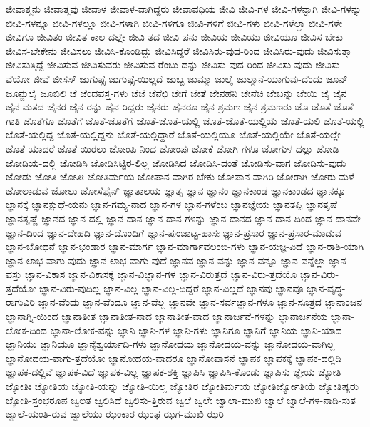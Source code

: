 {ಜೀವಾತ್ಮನು
ಜೀವಾತ್ಮವು
ಜೀವಾಳ
ಜೀವಾಳ-ವಾಗಿದ್ದರು
ಜೀವಾವಧಿಯ
ಜೀವಿ
ಜೀವಿ-ಗಳ
ಜೀವಿ-ಗಳನ್ನಾಗಿ
ಜೀವಿ-ಗಳನ್ನು
ಜೀವಿ-ಗಳನ್ನೂ
ಜೀವಿ-ಗಳಲ್ಲೂ
ಜೀವಿ-ಗಳಾಗಿ
ಜೀವಿ-ಗಳಿಗೂ
ಜೀವಿ-ಗಳಿಗೆ
ಜೀವಿ-ಗಳು
ಜೀವಿ-ಗಳೆಲ್ಲಾ
ಜೀವಿ-ಗಳೇ
ಜೀವಿಗೂ
ಜೀವಿತಂ
ಜೀವಿತ-ಕಾಲ-ದಲ್ಲೇ
ಜೀವಿ-ತದ
ಜೀವಿ-ಪನು
ಜೀವಿಯ
ಜೀವಿಯು
ಜೀವಿಯೂ
ಜೀವಿಸ-ಬೇಕು
ಜೀವಿಸ-ಬೇಕೇನು
ಜೀವಿಸಲು
ಜೀವಿಸಿ-ಕೊಂಡಿದ್ದು
ಜೀವಿಸಿದ್ದರೆ
ಜೀವಿಸಿರು-ವುದ-ರಿಂದ
ಜೀವಿಸಿರು-ವುದು
ಜೀವಿಸುತ್ತಾ
ಜೀವಿಸುತ್ತಿದ್ದೆ
ಜೀವಿಸುವ
ಜೀವಿಸುವರು
ಜೀವಿಸುವ-ರೆಂಬು-ದನ್ನು
ಜೀವಿಸು-ವುದ-ರಿಂದ
ಜೀವಿಸು-ವುದು
ಜೀವಿಸು-ವೆಯೋ
ಜೀವೆ
ಜೀಸಸ್
ಜುಗುಪ್ಸೆ
ಜುಗುಪ್ಸೆ-ಯಿಲ್ಲದೆ
ಜುಬ್ಬ
ಜುಮ್ಮಾ
ಜುಲೈ
ಜುಲ್ಮಾನೆ-ಯಾಗುವು-ದೆಂದು
ಜೂನ್
ಜೂನ್ಜುಲೈ
ಜೂಬಿಲಿ
ಜೆ
ಜೆಂದವಸ್ತ-ಗಳು
ಜೆಜೆ
ಜೆನೆಛಿ
ಜೇಗೆ
ಜೇತೆ
ಜೇನಹನಿ
ಜೇನೆಚಿ
ಜೇಬನ್ನು
ಜೇಯಿ
ಜೈ
ಜೈನ
ಜೈನ-ಮತದ
ಜೈನರ
ಜೈನ-ರನ್ನು
ಜೈನ-ರಿದ್ದರು
ಜೈನರು
ಜೈನರೂ
ಜೈನ-ಶ್ರಮಣ
ಜೈನ-ಶ್ರಮಣರು
ಜೊ
ಜೊತೆ
ಜೊತೆ-ಗಾತಿ
ಜೊತೆಗೂ
ಜೊತೆಗೆ
ಜೊತೆ-ಜೊತೆಗೆ
ಜೊತೆ-ಜೊತೆ-ಯಲ್ಲಿ
ಜೊತೆ-ಜೊತೆ-ಯಲ್ಲಿಯೆ
ಜೊತೆ-ಯಲಿ
ಜೊತೆ-ಯಲ್ಲಿ
ಜೊತೆ-ಯಲ್ಲಿದ್ದ
ಜೊತೆ-ಯಲ್ಲಿದ್ದನು
ಜೊತೆ-ಯಲ್ಲಿದ್ದಾರೆ
ಜೊತೆ-ಯಲ್ಲಿಯೂ
ಜೊತೆ-ಯಲ್ಲಿಯೇ
ಜೊತೆ-ಯಲ್ಲೇ
ಜೊತೆ-ಯಾದರೆ
ಜೊತೆ-ಯಿರಲು
ಜೋಂಪಿ-ನಿಂದ
ಜೋಂಪು
ಜೋಕೆ
ಜೋಗಿ-ಗಳೂ
ಜೋಗುಳ-ದಲ್ಲು
ಜೋಡಿ
ಜೋಡಿಯ-ದಲ್ಲಿ
ಜೋಡಿಸಿ
ಜೋಡಿಸಿಟ್ಟಿರ-ಲಿಲ್ಲ
ಜೋಡಿಸಿದ
ಜೋಡಿಸಿ-ದಂತೆ
ಜೋಡಿಸು-ವಾಗ
ಜೋಡಿಸು-ವುದು
ಜೋಡು
ಜೋತಿ
ಜೋತಿಃ
ಜೋತಿರ್ಮಯ
ಜೋಪಾನ-ವಾಗಿರ-ಬೇಕು
ಜೋಪಾನ-ವಾಗಿರಿ
ಜೋರಾಗಿ
ಜೋರು-ಮಳೆ
ಜೋಲಾಡುವ
ಜೋಲು
ಜೋಸೆಫೈನ್
ಜ್ಞಾತಾಲಯ
ಜ್ಞಾತೃ
ಜ್ಞಾನ
ಜ್ಞಾನಂ
ಜ್ಞಾನಕಾಂಡ
ಜ್ಞಾನಕಾಂಡದ
ಜ್ಞಾನಕ್ಕೂ
ಜ್ಞಾನಕ್ಕೆ
ಜ್ಞಾನಕ್ಷುಧೆ-ಯನು
ಜ್ಞಾನ-ಗಮ್ಯ-ನಾದ
ಜ್ಞಾನ-ಗಳ
ಜ್ಞಾನ-ಗಳೆಂಬ
ಜ್ಞಾನಜ್ಞೇಯ
ಜ್ಞಾನತಪ್ಪಿ
ಜ್ಞಾನತೃಷೆ
ಜ್ಞಾನತೃಷ್ಣೆ
ಜ್ಞಾನದ
ಜ್ಞಾನ-ದಲ್ಲಿ
ಜ್ಞಾನ-ದಾನ
ಜ್ಞಾನ-ದಾನ-ಗಳನ್ನು
ಜ್ಞಾನ-ದಾನದ
ಜ್ಞಾನ-ದಾನ-ದಿಂದ
ಜ್ಞಾನ-ದಾನವೇ
ಜ್ಞಾನ-ದಿಂದ
ಜ್ಞಾನ-ದೇಹದಿ
ಜ್ಞಾನ-ದೊಂದಿಗೆ
ಜ್ಞಾನ-ಪುಂಜಾಟ್ಟ-ಹಾಸಃ
ಜ್ಞಾನ-ಪ್ರಸಾರ
ಜ್ಞಾನ-ಪ್ರಸಾರ-ಮಾಡುವ
ಜ್ಞಾನ-ಬೋಧನೆ
ಜ್ಞಾನ-ಭಂಡಾರ
ಜ್ಞಾನ-ಮಾರ್ಗ
ಜ್ಞಾನ-ಮಾರ್ಗಾವಲಂಬಿ-ಗಳು
ಜ್ಞಾನ-ಯಜ್ಞ-ವಿದೆ
ಜ್ಞಾನ-ರಾಶಿ-ಯಾಗಿ
ಜ್ಞಾನ-ಲಾಭ-ವಾಗು-ವುದು
ಜ್ಞಾನ-ಲಾಭ-ವಾಗು-ವುದೆ
ಜ್ಞಾನವ
ಜ್ಞಾನ-ವನ್ನು
ಜ್ಞಾನ-ವನ್ನೂ
ಜ್ಞಾನ-ವನ್ನೆಲ್ಲಾ
ಜ್ಞಾನ-ವಸ್ತು
ಜ್ಞಾನ-ವಿಕಾಸ
ಜ್ಞಾನ-ವಿಕಾಸಕ್ಕೆ
ಜ್ಞಾನ-ವಿಜ್ಞಾನ-ಗಳ
ಜ್ಞಾನ-ವಿರುತ್ತದೆ
ಜ್ಞಾನ-ವಿರು-ತ್ತದೆಯೊ
ಜ್ಞಾನ-ವಿರು-ತ್ತದೆಯೋ
ಜ್ಞಾನ-ವಿರು-ವುದಿಲ್ಲ
ಜ್ಞಾನ-ವಿಲ್ಲ
ಜ್ಞಾನ-ವಿಲ್ಲ-ದಿದ್ದರೆ
ಜ್ಞಾನ-ವಿಲ್ಲದೆ
ಜ್ಞಾನವು
ಜ್ಞಾನವೂ
ಜ್ಞಾನ-ವೃದ್ಧ-ರಾಗುವಿರಿ
ಜ್ಞಾನ-ವೆಂದು
ಜ್ಞಾನ-ವೆಂದೂ
ಜ್ಞಾನ-ವೆಲ್ಲ
ಜ್ಞಾನವೇ
ಜ್ಞಾನ-ಸರ್ವಜ್ಞಾನ-ಗಳೂ
ಜ್ಞಾನ-ಸೂತ್ರದ
ಜ್ಞಾನಾಂಜನ
ಜ್ಞಾನಾಗ್ನಿ-ಯಿಂದ
ಜ್ಞಾನಾತೀತ
ಜ್ಞಾನಾತೀತ-ನಾದ
ಜ್ಞಾನಾತೀತ-ವಾದ
ಜ್ಞಾನಾರ್ಜನೆ-ಗಳನ್ನು
ಜ್ಞಾನಾರ್ಜನೆಯ
ಜ್ಞಾನಾ-ಲೋಕ-ದಿಂದ
ಜ್ಞಾನಾ-ಲೋಕ-ವನ್ನು
ಜ್ಞಾನಿ
ಜ್ಞಾನಿ-ಗಳ
ಜ್ಞಾನಿ-ಗಳು
ಜ್ಞಾನಿಗೂ
ಜ್ಞಾನಿಗೆ
ಜ್ಞಾನಿಯ
ಜ್ಞಾನಿ-ಯಾದ
ಜ್ಞಾನಿಯು
ಜ್ಞಾನಿಯೂ
ಜ್ಞಾನೈಶ್ವರ್ಯಾದಿ-ಗಳು
ಜ್ಞಾನೋದಯ
ಜ್ಞಾನೋದಯ-ವನ್ನು
ಜ್ಞಾನೋದಯ-ವಾಗಿಲ್ಲ
ಜ್ಞಾನೋದಯ-ವಾಗು-ತ್ತದೆಯೋ
ಜ್ಞಾನೋದಯ-ವಾದರೂ
ಜ್ಞಾನೋಪಾಸನೆ
ಜ್ಞಾಪಕ
ಜ್ಞಾಪಕಕ್ಕೆ
ಜ್ಞಾಪಕ-ದಲ್ಲಿಡಿ
ಜ್ಞಾಪಕ-ದಲ್ಲಿವೆ
ಜ್ಞಾಪಕ-ವಿದೆ
ಜ್ಞಾಪಕ-ವಿಲ್ಲ
ಜ್ಞಾಪಕ-ಶಕ್ತಿ
ಜ್ಞಾಪಿಸಿ
ಜ್ಞಾಪಿಸಿ-ಕೊಂಡು
ಜ್ಞಾಪಿಸು
ಜ್ಞೇಯ
ಜ್ಯೋತಿ
ಜ್ಯೋತಿಃ
ಜ್ಯೋತಿಯ
ಜ್ಯೋತಿ-ಯನ್ನು
ಜ್ಯೋತಿ-ಯಿಲ್ಲ
ಜ್ಯೋತಿರ
ಜ್ಯೋತಿರ್ಮಯ
ಜ್ಯೋತಿರ್ಜ್ಯೋತಿಯೆ
ಜ್ಯೋತಿಷ್ಯರು
ಜ್ಯೋತಿ-ಸ್ತಂಭರೂಪ
ಜ್ವಲತ
ಜ್ವಲಿಸಿದೆ
ಜ್ವಲಿಸು-ತ್ತಿರುವ
ಜ್ವಲೆ
ಜ್ವಲೇ
ಜ್ವಾಲಾ-ಮುಖಿ
ಜ್ವಾಲೆ
ಜ್ವಾಲೆ-ಗಳ-ನಾಡಿ-ಸುತ
ಜ್ವಾಲೆ-ಯಂತಿ-ರುವ
ಜ್ವಾಲೆಯು
ಝಂಕಾರ
ಝಂಫ
ಝಗ-ಮುಖಿ
ಝರಿ
}
